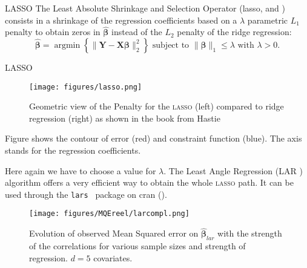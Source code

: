 \documentclass[11pt]{beamer}
\begin{document}
		\begin{frame}{LASSO}
		The Least Absolute Shrinkage and Selection Operator ({\sc lasso}, \cite{tibshirani1996regression} and \cite{tibshiranilasso}) consists in a shrinkage of the regression coefficients based on a $\lambda$ parametric $L_1$ penalty to obtain zeros in $\hat{\boldsymbol{\beta}}$ instead of the $L_2$ penalty of the ridge regression:
		\begin{equation}
		 \boldsymbol{\hat{\beta}}=\operatorname{argmin} \left\lbrace \parallel \boldsymbol{Y}-\boldsymbol{X\beta}\parallel_2^2 \right\rbrace \textrm{ subject to } \parallel\boldsymbol{\beta} \parallel_1\leq \lambda \textrm{ with } \lambda>0 . \nonumber 
		\end{equation}	
		
		
		
		\end{frame}
		\begin{frame}{LASSO}
		\begin{figure}[h!]
			\centering
			\texttt{[image: figures/lasso.png]} 
			\caption{Geometric view of the Penalty for the \textsc{lasso} (left) compared to ridge regression (right) as shown in the book from Hastie \cite{hastie2009elements}} \label{lassogeom}
		\end{figure}
		Figure shows the contour of error (red) and constraint function (blue).
		  The axis stands for the regression coefficients.
		\end{frame}
		
\begin{frame}

		Here again we have to choose a value for $\lambda$.
	 The Least Angle Regression (\textsc{LAR} \cite{efron2004least}) algorithm offers a very efficient way to obtain the whole \textsc{lasso} path.  It can be used through the {\tt lars } package on {\sc cran} (\cite{packagelars}).
\end{frame}		

\begin{frame}
 \begin{figure}
	 \centering
	  \texttt{[image: figures/MQEreel/larcompl.png]}
	  \caption{Evolution of observed Mean Squared error on $\hat{\boldsymbol{\beta}}_{lar}$ with the strength of the correlations for various sample sizes and strength of regression. $d=5$ covariates. } \label{MQElarcompl}
	\end{figure}	
\end{frame}
		
		
		
\end{document}
